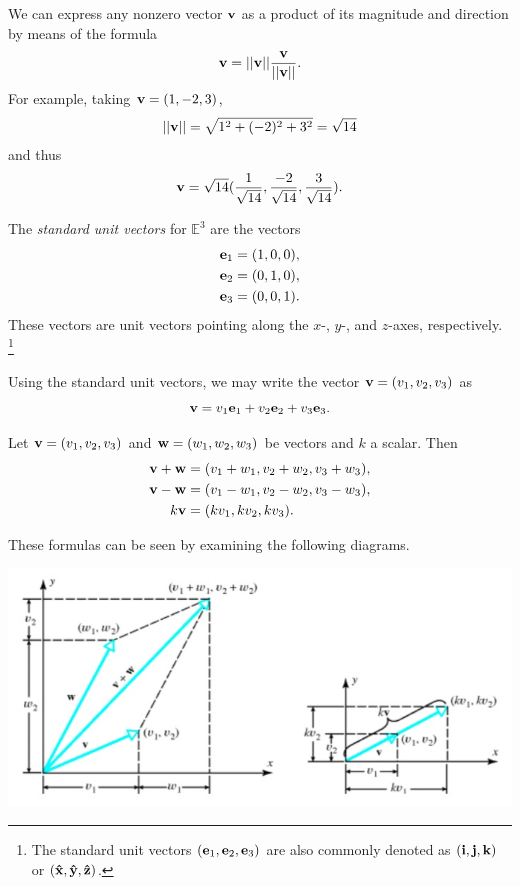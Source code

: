 \documentclass[12pt,letterpaper,reqno]{article}
\numberwithin{equation}{section}
\newcommand{\ti}[1]{\textit{#1}}
\begin{document}
\begin{example}
	We can express any nonzero vector ${\bf v}$ as a product of its magnitude and direction by means of the formula
	\begin{align*}
		{\bf v}=||{\bf v}||\frac{{\bf v}}{||{\bf v}||}.
	\end{align*}
	For example, taking ${\bf v}=(1,-2,3)$,
	\begin{align*}
		||{\bf v}||=\sqrt{1^2+(-2)^2+3^2}=\sqrt{14}
	\end{align*}
	and thus
	\begin{align*}
		{\bf v}=\sqrt{14}(\frac{1}{\sqrt{14}},\frac{-2}{\sqrt{14}},\frac{3}{\sqrt{14}}).
	\end{align*}
\end{example}


\begin{defn}
	 The \ti{standard unit vectors} for $\mathbb{E}^3$ are the vectors
	\begin{align*}
		{\bf e}_1&=(1,0,0), \\
		{\bf e}_2&=(0,1,0), \\
		{\bf e}_3&=(0,0,1). \\
	\end{align*}
These vectors are unit vectors pointing along the $x$-, $y$-, and $z$-axes, respectively. \footnote{The standard unit vectors $({\bf e}_1,{\bf e}_2,{\bf e}_3)$ are also commonly denoted as $({\bf i}, {\bf j}, {\bf k})$ or $({\bf \hat{x}}, {\bf \hat{y}}, {\bf \hat{z}})$.}	
\end{defn}
Using the standard unit vectors, we may write the vector ${\bf v}=(v_1,v_2,v_3)$ as $${\bf v}=v_1{\bf e}_1+v_2{\bf e}_2+v_3{\bf e}_3.$$

\begin{prop}
	Let ${\bf v}=(v_1,v_2,v_3)$ and ${\bf w}=(w_1,w_2,w_3)$ be vectors and $k$ a scalar. Then
	\begin{align*}
		{\bf v}+{\bf w}&=(v_1+w_1,v_2+w_2,v_3+w_3), \\
		{\bf v}-{\bf w}&=(v_1-w_1,v_2-w_2,v_3-w_3), \\
		k{\bf v}&=(kv_1,kv_2,kv_3).
	\end{align*}
\end{prop}

\begin{pf}
These formulas can be seen by examining the following diagrams.
\begin{center}
	\includegraphics[scale=0.5]{figures_mvc/vector_operations}
\end{center}	
\end{pf}
\end{document}
